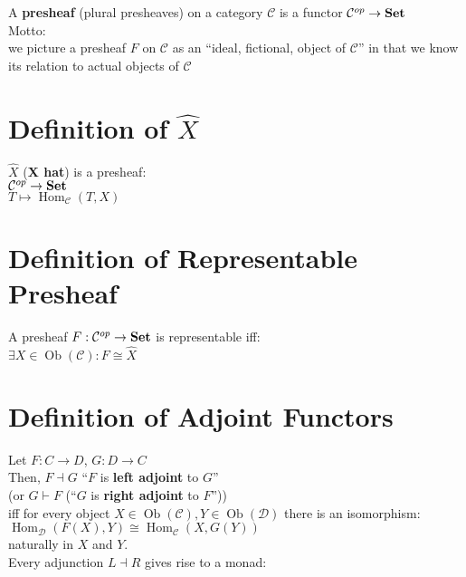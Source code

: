 \documentclass[a4paper, twoside, english, 11pt]{book}
\DeclareMathOperator{\Hom}{Hom}
\DeclareMathOperator{\Ob}{Ob}
\newcommand{\C}{\mathcal C}
\newcommand{\D}{\mathcal D}
\newcommand{\catname}[1]{{\normalfont\textbf{#1}}}
\newcommand{\Set}{\catname{Set}}
\begin{document}
A \textbf{presheaf} (plural presheaves) on a category $\C$ is a functor $\C^{op} \rightarrow \Set$ \\

\noindent
Motto: \\
we picture a presheaf $F$ on $\C$ as an ``ideal, fictional, object of $\C$'' in that we know its relation to actual objects of $\C$



\section {Definition of $\hat X$}

$\hat X$ (\textbf{X hat}) is a presheaf: \\

$\C^{op} \rightarrow \Set$ \\
\indent
$T \mapsto \Hom_\C(T, X)$



\section{Definition of Representable Presheaf}

A presheaf $F : \C^{op} \rightarrow \Set$ is representable iff: \\

$\exists X \in \Ob(\C) : F \cong \hat X$



\section{Definition of Adjoint Functors}

Let $F : C \rightarrow D$, $G : D \rightarrow C$ \\

\noindent
Then, $F \dashv G$ ``$F$ is \textbf{left adjoint} to $G$'' \\
(or $G \vdash F$ (``$G$ is \textbf{right adjoint} to $F$'')) \\

\noindent
iff for every object $X \in \Ob(\C), Y \in \Ob(\D)$ there is an isomorphism: \\

$\Hom_\D(F(X), Y) \cong \Hom_\C(X, G(Y))$ \\

\noindent
naturally in $X$ and $Y$. \\

\noindent
Every adjunction $L \dashv R$ gives rise to a monad: \\
\end{document}
